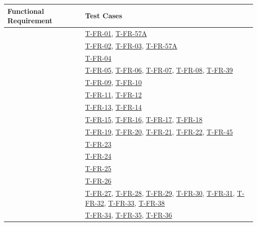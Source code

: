 \documentclass[12pt, titlepage]{article}
\providecommand{\descriptiveid}[1]{\texttt{\detokenize{#1}}}
\providecommand{\rref}[1]{\descriptiveid{#1}}
\begin{document}
  \begin{longtable}{p{} p{}}

    \toprule
    Functional Requirement & Test Cases \\
    \midrule
    \rref{FR_SupervisorProposal} & \hyperref[T-FR-01]{T-FR-01}, \hyperref[T-FR-57A]{T-FR-57A} \\ \hline
    \rref{FR_ProposalOptionalFields} & \hyperref[T-FR-02]{T-FR-02}, \hyperref[T-FR-03]{T-FR-03}, \hyperref[T-FR-57A]{T-FR-57A} \\ \hline
    \rref{FR_StudentProposal} & \hyperref[T-FR-04]{T-FR-04} \\ \hline
    \rref{FR_ReviewProposal} & \hyperref[T-FR-05]{T-FR-05}, \hyperref[T-FR-06]{T-FR-06}, \hyperref[T-FR-07]{T-FR-07}, \hyperref[T-FR-08]{T-FR-08}, \hyperref[T-FR-39]{T-FR-39} \\ \hline
    \rref{FR_ViewApprovedProjects} & \hyperref[T-FR-09]{T-FR-09}, \hyperref[T-FR-10]{T-FR-10} \\ \hline
    \rref{FR_ViewProjectStatus} & \hyperref[T-FR-11]{T-FR-11}, \hyperref[T-FR-12]{T-FR-12} \\ \hline
    \rref{FR_StudentProfile} & \hyperref[T-FR-13]{T-FR-13}, \hyperref[T-FR-14]{T-FR-14} \\ \hline
    \rref{FR_StudentTeams} & \hyperref[T-FR-15]{T-FR-15}, \hyperref[T-FR-16]{T-FR-16}, \hyperref[T-FR-17]{T-FR-17}, \hyperref[T-FR-18]{T-FR-18} \\ \hline
    \rref{FR_ValidateTeamRules} & \hyperref[T-FR-19]{T-FR-19}, \hyperref[T-FR-20]{T-FR-20}, \hyperref[T-FR-21]{T-FR-21}, \hyperref[T-FR-22]{T-FR-22}, \hyperref[T-FR-45]{T-FR-45} \\ \hline
    \rref{FR_TeamDiscovery} & \hyperref[T-FR-23]{T-FR-23} \\ \hline
    \rref{FR_TeamProfile} & \hyperref[T-FR-24]{T-FR-24} \\ \hline
    \rref{FR_TeamRecommend} & \hyperref[T-FR-25]{T-FR-25} \\ \hline
    \rref{FR_ProjectInterest} & \hyperref[T-FR-26]{T-FR-26} \\ \hline
    \rref{FR_DeclineTeam} & \hyperref[T-FR-27]{T-FR-27}, \hyperref[T-FR-28]{T-FR-28}, \hyperref[T-FR-29]{T-FR-29}, \hyperref[T-FR-30]{T-FR-30}, \hyperref[T-FR-31]{T-FR-31}, \hyperref[T-FR-32]{T-FR-32}, \hyperref[T-FR-33]{T-FR-33}, \hyperref[T-FR-38]{T-FR-38} \\ \hline
    \rref{FR_ProjectThreads} & \hyperref[T-FR-34]{T-FR-34}, \hyperref[T-FR-35]{T-FR-35}, \hyperref[T-FR-36]{T-FR-36} \\ \hline

\end{longtable}
\end{document}

